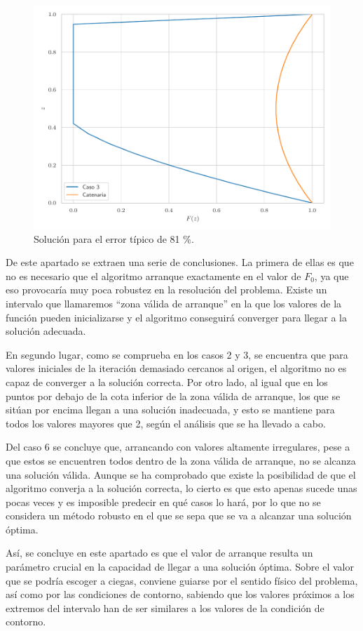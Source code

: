 \begin{figure}[h]
    \centering
    \includegraphics[width = 0.6 \linewidth]{Figures/01/sol_cambioF0.pdf}
    \caption{Solución para el error típico de 81 \%.}
    \label{fig:sol_cambioF0}
\end{figure}

De este apartado se extraen una serie de conclusiones. La primera de ellas es que no es necesario que el algoritmo arranque exactamente en el valor de $F_0$, ya que eso provocaría muy poca robustez en la resolución del problema. Existe un intervalo que llamaremos “zona válida de arranque” en la que los valores de la función pueden inicializarse y el algoritmo conseguirá converger para llegar a la solución adecuada. 

En segundo lugar, como se comprueba en los casos 2 y 3, se encuentra que para valores iniciales de la iteración demasiado cercanos al origen, el algoritmo no es capaz de converger a la solución correcta. Por otro lado, al igual que en los puntos por debajo de la cota inferior de la zona válida de arranque, los que se sitúan por encima llegan a una solución inadecuada, y esto se mantiene para todos los valores mayores que 2, según el análisis que se ha llevado a cabo.

Del caso 6 se concluye que, arrancando con valores altamente irregulares, pese a que estos se encuentren todos dentro de la zona válida de arranque, no se alcanza una solución válida. Aunque se ha comprobado que existe la posibilidad de que el algoritmo converja a la solución correcta, lo cierto es que esto apenas sucede unas pocas veces y es imposible predecir en qué casos lo hará, por lo que no se considera un método robusto en el que se sepa que se va a alcanzar una solución óptima.

Así, se concluye en este apartado es que el valor de arranque resulta un parámetro crucial en la capacidad de llegar a una solución óptima. Sobre el valor que se podría escoger a ciegas, conviene guiarse por el sentido físico del problema, así como por las condiciones de contorno, sabiendo que los valores próximos a los extremos del intervalo han de ser similares a los valores de la condición de contorno.


